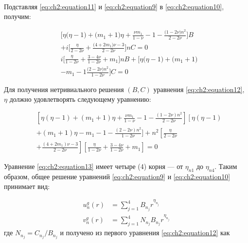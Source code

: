 Подставляя \cref{eq:ch2:equation11} и \cref{eq:ch2:equation9} в \cref{eq:ch2:equation10}, получим:

\begin{equation}
\label{eq:ch2:equation12}
\begin{split}
	&\big [ \eta \big (\eta-1 \big) + \big (m_1 +1 \big) \eta + \frac{\nu m_1}{1-\nu} - 1 -\frac{ \big (1-2\nu \big)n^2}{2-2\nu} \big ] B \\
&+ i \big [\frac{\eta}{2-2\nu} + \frac{\big (4+2m_1 \big ) \nu -3 }{2-2\nu}  \big ] n C=0\\
&i \big [\frac{\eta}{1-2\nu} + \frac{3-4\nu}{1-2\nu} + m_1 \big ]nB+\big [ \eta \big ( \eta-1\big ) + \big (m_1 +1 \big ) \\
&- m_1 -1 \frac{\big (2-2\nu \big ) n^2}{1-2\nu} \big ] C=0
\end{split}
\end{equation}

Для получения нетривиального решения \( (B, C) \) уравнения \cref{eq:ch2:equation12}, \( \eta \) должно удовлетворять следующему уравнению:

\begin{equation}
\label{eq:ch2:equation13}
\begin{split}
	& \left [\eta  \left (\eta -1 \right )+  \left ( m_1 +1 \right ) \eta + \frac{\nu m_1}{1-\nu} -1 - \frac{ \left (1 - 2\nu  \right  ) n^2}{2-2\nu} \right ]  \left [ \eta  \left (\eta -1 \right ) \right. \\
	&+ \left. \left  ( m_1 + 1 \right ) \eta - m_1 - 1 - \frac{ \left ( 2-2\nu  \right ) n^2}{1-2\nu}  \right. ] +n^2 \left [ \frac{\eta}{2-2\nu}  \right. \\
	&+  \left. \frac{  \left ( 4+2 m_1 \right ) \nu -3}{2-2\nu}  \right ] \left  [ \frac{\eta}{1-2\nu} + \frac{3-4\nu}{1-2\nu} +m_1 \right ] = 0
\end{split}
\end{equation}

Уравнение \cref{eq:ch2:equation13} имеет четыре (4) корня --- от \( \eta_{n1} \) до \( \eta_{n4} \). Таким образом, общее решение уравнений \cref{eq:ch2:equation9} и \cref{eq:ch2:equation10} принимает вид:

\begin{equation}
\label{eq:ch2:equation14}
\begin{split}
	u_n^g(r) &= \sum_{j=1}^4 B_{n_j} r^{\eta_{n_j}}\\
	v_n^g(r) &= \sum_{j=1}^4 N_{n_j} B_{n_j} r^{\eta_{n_j}}
\end{split}
\end{equation}
где \( N_{n_j} = C_{n_j} / B_{n_j}\) и получено из первого уравнения \cref{eq:ch2:equation12} как

